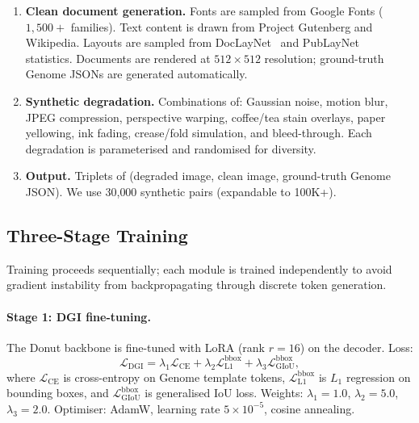 \documentclass[conference]{IEEEtran}
\begin{document}
\begin{enumerate}[leftmargin=*,nosep]
\item \textbf{Clean document generation.}
  Fonts are sampled from Google Fonts ($1{,}500{+}$ families).  Text content is drawn
  from Project Gutenberg and Wikipedia.  Layouts are sampled from DocLayNet~\cite{pfitzmann2022doclaynet}
  and PubLayNet~\cite{zhong2019publaynet} statistics.  Documents are rendered at
  $512{\times}512$ resolution; ground-truth Genome JSONs are generated automatically.

\item \textbf{Synthetic degradation.}
  Combinations of: Gaussian noise, motion blur, JPEG compression, perspective
  warping, coffee/tea stain overlays, paper yellowing, ink fading, crease/fold
  simulation, and bleed-through.  Each degradation is parameterised and randomised
  for diversity.

\item \textbf{Output.}
  Triplets of (degraded image, clean image, ground-truth Genome JSON).
  We use 30{,}000 synthetic pairs (expandable to 100K+).
\end{enumerate}

\subsection{Three-Stage Training}
\label{sec:stages}

Training proceeds sequentially; each module is trained independently to avoid
gradient instability from backpropagating through discrete token generation.

\paragraph{Stage 1: DGI fine-tuning.}
The Donut backbone is fine-tuned with LoRA (rank $r{=}16$) on the decoder.
Loss:
\begin{equation}
  \mathcal{L}_\text{DGI} = \lambda_1 \mathcal{L}_\text{CE}
    + \lambda_2 \mathcal{L}_\text{L1}^\text{bbox}
    + \lambda_3 \mathcal{L}_\text{GIoU}^\text{bbox},
  \label{eq:dgi_loss}
\end{equation}
where $\mathcal{L}_\text{CE}$ is cross-entropy on Genome template tokens,
$\mathcal{L}_\text{L1}^\text{bbox}$ is $L_1$ regression on bounding boxes, and
$\mathcal{L}_\text{GIoU}^\text{bbox}$ is generalised IoU loss.
Weights: $\lambda_1{=}1.0$, $\lambda_2{=}5.0$, $\lambda_3{=}2.0$.
Optimiser: AdamW, learning rate $5{\times}10^{-5}$, cosine annealing.
\end{document}
